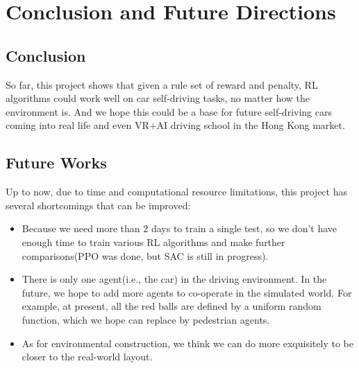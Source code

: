 
\chapter{Conclusion and Future Directions} %

\label{Chapter4} %


\section{Conclusion}
So far, this project shows that given a rule set of reward and penalty, RL algorithms could work well on car self-driving tasks, no matter how the environment is. And we hope this could be a base for future self-driving cars coming into real life and even VR+AI driving school in the Hong Kong market.

\section{Future Works}
Up to now, due to time and computational resource limitations, this project has several shortcomings that can be improved:
\begin{itemize}
\item Because we need more than 2 days to train a single test, so we don't have enough time to train various RL algorithms and make further comparisons(PPO was done, but SAC is still in progress).
\item There is only one agent(i.e., the car) in the driving environment. In the future, we hope to add more agents to co-operate in the simulated world. For example, at present, all the red balls are defined by a uniform random function, which we hope can replace by pedestrian agents.
\item As for environmental construction, we think we can do more exquisitely to be closer to the real-world layout.
\end{itemize}